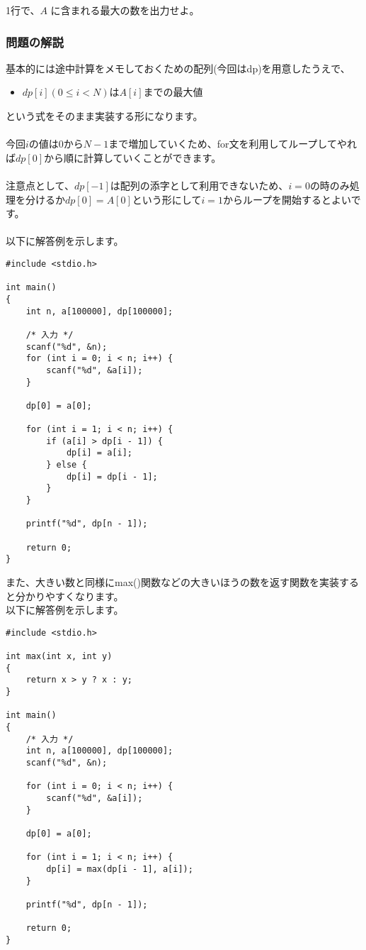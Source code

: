 \noindent
1行で、$A$ に含まれる最大の数を出力せよ。

\clearpage

\subsubsection{問題の解説}

\noindent
基本的には途中計算をメモしておくための配列(今回はdp)を用意したうえで、

\begin{itemize}
    \item $dp[i](0 \leq i < N)$は$A[i]$までの最大値
\end{itemize}

\noindent
という式をそのまま実装する形になります。
\\ \\ \noindent
今回$i$の値は0から$N-1$まで増加していくため、for文を利用してループしてやれば$dp[0]$から順に計算していくことができます。
\\ \\ \noindent
注意点として、$dp[-1]$は配列の添字として利用できないため、$i=0$の時のみ処理を分けるか$dp[0]=A[0]$という形にして$i=1$からループを開始するとよいです。
\\ \\ \noindent
以下に解答例を示します。

\noindent
\begin{lstlisting}[style = customC]
#include <stdio.h>

int main() 
{
    int n, a[100000], dp[100000];

    /* 入力 */
    scanf("%d", &n);
    for (int i = 0; i < n; i++) {
        scanf("%d", &a[i]);
    }

    dp[0] = a[0];

    for (int i = 1; i < n; i++) {
        if (a[i] > dp[i - 1]) {
            dp[i] = a[i];
        } else {
            dp[i] = dp[i - 1];
        }
    }

    printf("%d", dp[n - 1]);

    return 0;
}
\end{lstlisting}

\clearpage
\noindent
また、大きい数と同様にmax()関数などの大きいほうの数を返す関数を実装すると分かりやすくなります。\\
以下に解答例を示します。

\noindent
\begin{lstlisting}[style = customC]
#include <stdio.h>

int max(int x, int y) 
{ 
    return x > y ? x : y; 
}

int main()
{
    /* 入力 */
    int n, a[100000], dp[100000];
    scanf("%d", &n);

    for (int i = 0; i < n; i++) {
        scanf("%d", &a[i]);
    }

    dp[0] = a[0];

    for (int i = 1; i < n; i++) {
        dp[i] = max(dp[i - 1], a[i]);
    }

    printf("%d", dp[n - 1]);

    return 0;
}
\end{lstlisting}

